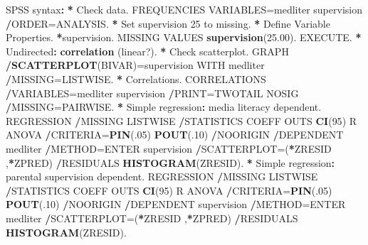 \documentclass[a4paper]{book}
\newenvironment{Shaded}{\begin{snugshade}}{\end{snugshade}}
\newcommand{\KeywordTok}[1]{\textcolor[rgb]{0,0,0}{\textbf{#1}}}
\newcommand{\DecValTok}[1]{\textcolor[rgb]{0.00,0.00,0.00}{#1}}
\newcommand{\FloatTok}[1]{\textcolor[rgb]{0.00,0.00,0.00}{#1}}
\newcommand{\StringTok}[1]{\textcolor[rgb]{0.00,0.00,0.00}{#1}}
\newcommand{\OperatorTok}[1]{\textcolor[rgb]{0.00,0.00,0.00}{\textbf{#1}}}
\newcommand{\ErrorTok}[1]{\textcolor[rgb]{0.00,0.00,0.00}{\textbf{#1}}}
\newcommand{\NormalTok}[1]{#1}
\theoremstyle{definition}
\theoremstyle{definition}
\theoremstyle{definition}
\theoremstyle{remark}
\begin{document}
\begin{Shaded}
\begin{Highlighting}[]
\NormalTok{SPSS syntax}\OperatorTok{:}\StringTok{  }
\StringTok{  }
\ErrorTok{*}\StringTok{ }\NormalTok{Check data.  }
\NormalTok{FREQUENCIES VARIABLES=medliter supervision  }
  \OperatorTok{/}\NormalTok{ORDER=ANALYSIS.  }
\OperatorTok{*}\StringTok{ }\NormalTok{Set supervision }\DecValTok{25}\NormalTok{ to missing.  }
\OperatorTok{*}\StringTok{ }\NormalTok{Define Variable Properties.  }
\OperatorTok{*}\NormalTok{supervision.  }
\NormalTok{MISSING VALUES }\KeywordTok{supervision}\NormalTok{(}\FloatTok{25.00}\NormalTok{).  }
\NormalTok{EXECUTE.  }
\OperatorTok{*}\StringTok{ }\NormalTok{Undirected}\OperatorTok{:}\StringTok{ }\KeywordTok{correlation}\NormalTok{ (linear?).  }
\OperatorTok{*}\StringTok{ }\NormalTok{Check scatterplot.  }
\NormalTok{GRAPH  }
  \OperatorTok{/}\KeywordTok{SCATTERPLOT}\NormalTok{(BIVAR)=supervision WITH medliter  }
  \OperatorTok{/}\NormalTok{MISSING=LISTWISE.  }
\OperatorTok{*}\StringTok{ }\NormalTok{Correlations.  }
\NormalTok{CORRELATIONS  }
  \OperatorTok{/}\NormalTok{VARIABLES=medliter supervision  }
  \OperatorTok{/}\NormalTok{PRINT=TWOTAIL NOSIG  }
  \OperatorTok{/}\NormalTok{MISSING=PAIRWISE.  }
\OperatorTok{*}\StringTok{ }\NormalTok{Simple regression}\OperatorTok{:}\StringTok{ }\NormalTok{media literacy dependent.  }
\NormalTok{REGRESSION  }
  \OperatorTok{/}\NormalTok{MISSING LISTWISE  }
  \OperatorTok{/}\NormalTok{STATISTICS COEFF OUTS }\KeywordTok{CI}\NormalTok{(}\DecValTok{95}\NormalTok{) R ANOVA  }
  \OperatorTok{/}\NormalTok{CRITERIA=}\KeywordTok{PIN}\NormalTok{(.}\DecValTok{05}\NormalTok{) }\KeywordTok{POUT}\NormalTok{(.}\DecValTok{10}\NormalTok{)  }
  \OperatorTok{/}\NormalTok{NOORIGIN   }
  \OperatorTok{/}\NormalTok{DEPENDENT medliter  }
  \OperatorTok{/}\NormalTok{METHOD=ENTER supervision  }
  \OperatorTok{/}\NormalTok{SCATTERPLOT=(}\OperatorTok{*}\NormalTok{ZRESID ,}\OperatorTok{*}\NormalTok{ZPRED)  }
  \OperatorTok{/}\NormalTok{RESIDUALS }\KeywordTok{HISTOGRAM}\NormalTok{(ZRESID).  }
\OperatorTok{*}\StringTok{ }\NormalTok{Simple regression}\OperatorTok{:}\StringTok{ }\NormalTok{parental supervision dependent.  }
\NormalTok{REGRESSION  }
  \OperatorTok{/}\NormalTok{MISSING LISTWISE  }
  \OperatorTok{/}\NormalTok{STATISTICS COEFF OUTS }\KeywordTok{CI}\NormalTok{(}\DecValTok{95}\NormalTok{) R ANOVA  }
  \OperatorTok{/}\NormalTok{CRITERIA=}\KeywordTok{PIN}\NormalTok{(.}\DecValTok{05}\NormalTok{) }\KeywordTok{POUT}\NormalTok{(.}\DecValTok{10}\NormalTok{)  }
  \OperatorTok{/}\NormalTok{NOORIGIN   }
  \OperatorTok{/}\NormalTok{DEPENDENT supervision  }
  \OperatorTok{/}\NormalTok{METHOD=ENTER medliter  }
  \OperatorTok{/}\NormalTok{SCATTERPLOT=(}\OperatorTok{*}\NormalTok{ZRESID ,}\OperatorTok{*}\NormalTok{ZPRED)  }
  \OperatorTok{/}\NormalTok{RESIDUALS }\KeywordTok{HISTOGRAM}\NormalTok{(ZRESID).  }
  

\end{Highlighting}
\end{Shaded}
\end{document}
